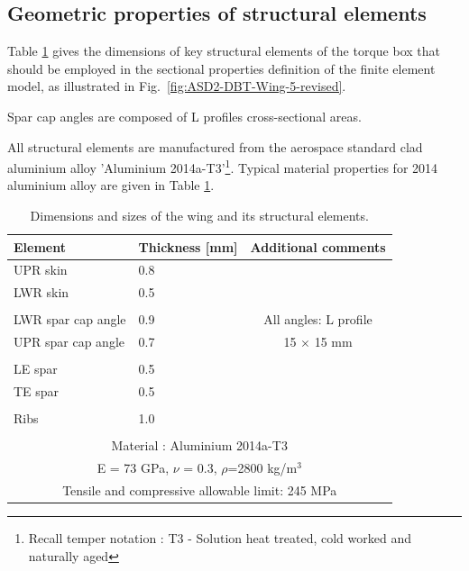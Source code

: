 \documentclass[11pt,a4paper,oneside]{memoir}
\begin{document}
\subsection{Geometric properties of structural elements}

Table \ref{tab:wing-size} gives the dimensions of key structural elements of the torque box that should be employed in the sectional properties definition of the finite element model, as illustrated in Fig.~\ref{fig:ASD2-DBT-Wing-5-revised}.


Spar cap angles are composed of L profiles cross-sectional areas. 

All structural elements are manufactured from the aerospace standard clad aluminium alloy 'Aluminium 2014a-T3'\footnote{Recall temper notation : T3 - Solution heat treated, cold worked and naturally aged}. Typical material properties for 2014 aluminium alloy are given in Table \ref{tab:wing-size}.  
%
\begin{table}[!h]
\centering
\caption{Dimensions and sizes of the wing and its structural elements.}
\label{tab:wing-size}
\begin{tabular}{llc}
\toprule
Element              & Thickness [mm]  &   Additional comments  \\    
\midrule
UPR skin             & 0.8         &  \\
LWR skin             & 0.5         &  \\
                     &             &  \\
LWR spar cap angle   & 0.9         &  All angles: L profile  \\
UPR spar cap angle   & 0.7         &  15 $\times$ 15 mm\\
                     &             &  \\
LE spar              & 0.5         &  \\
TE spar              & 0.5         &  \\
                     &             &  \\
Ribs                 & 1.0         &  \\
                     &             &  \\
\midrule
\multicolumn{3}{c}{Material : Aluminium 2014a-T3}\\
\multicolumn{3}{c}{E = 73 GPa, $\nu$ = 0.3, $\rho$=2800 kg/m$^{3}$}\\
\multicolumn{3}{c}{Tensile and compressive allowable limit: 245 MPa}\\
\bottomrule
\end{tabular}
\end{table}
\end{document}
